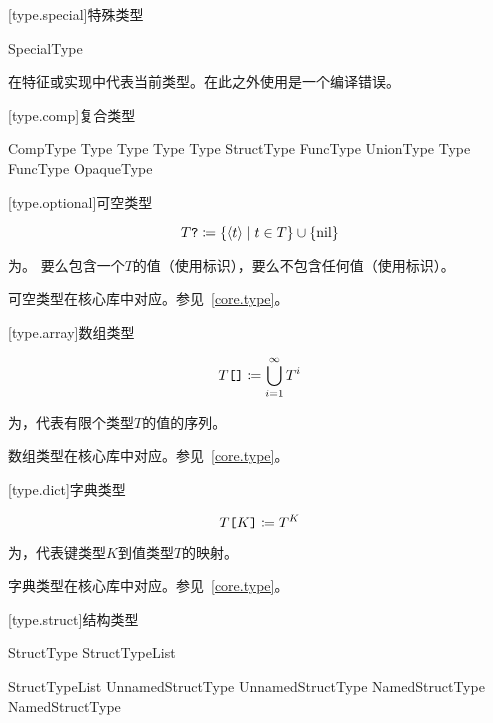 [type.special]{特殊类型}

\begin{bnf}{SpecialType}
\end{bnf}

\pnum
{}在特征或实现中代表当前类型。在此之外使用是一个编译错误。

[type.comp]{复合类型}

\begin{bnf}{CompType}
    Type  \br
    Type \terminal{[} \terminal{]} \br
    Type \terminal{[} Type \terminal{]} \br
    StructType \br
    FuncType \br
    UnionType \br
    Type \terminal{\&} \br
    FuncType \br
    OpaqueType
\end{bnf}

[type.optional]{可空类型}

$$ T\texttt{?} \coloneqq \{ \langle t \rangle \mid t \in T \} \cup \{ \mathrm{nil} \} $$

\pnum
{}为。
要么包含一个$T$的值（使用标识），要么不包含任何值（使用标识）。

\pnum
可空类型在核心库中对应。参见~\ref{core.type}。

[type.array]{数组类型}

$$ T\texttt{[]} \coloneqq \bigcup^\infty_{i=1} T^i $$

\pnum
{}为，代表有限个类型$T$的值的序列。

\pnum
数组类型在核心库中对应。参见~\ref{core.type}。

[type.dict]{字典类型}

$$ T\texttt{[}K\texttt{]} \coloneqq T^K $$

\pnum
{}为，代表键类型$K$到值类型$T$的映射。

\pnum
字典类型在核心库中对应。参见~\ref{core.type}。

[type.struct]{结构类型}

\begin{bnf}{StructType}
    \terminal{(} \terminal{)} \br
    \terminal{(} StructTypeList \terminal{,}\bnfq \terminal{)}
\end{bnf}

\begin{bnf}{StructTypeList}
    UnnamedStructType \br
    UnnamedStructType \terminal{,} NamedStructType \br
    NamedStructType
\end{bnf}

